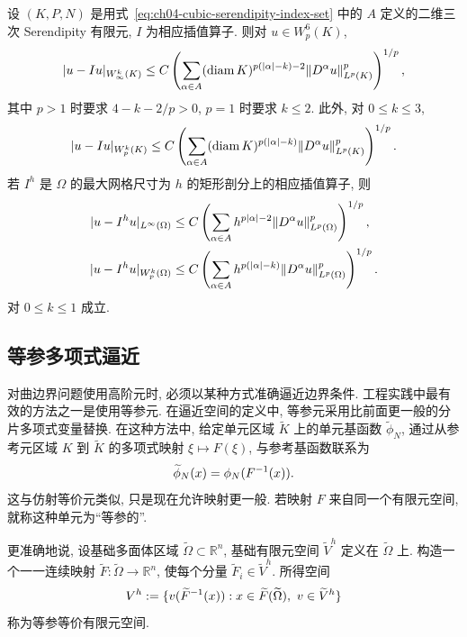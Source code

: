 \setcounter{thmcount}{20}
\begin{Theorem}
\label{thm:ch04-cubic-serendipity}
设 $(K,P,N)$ 是用式~\eqref{eq:ch04-cubic-serendipity-index-set} 中的 $A$ 定义的二维三次 Serendipity 有限元, $I$ 为相应插值算子. 则对 $u\in W_p^6(K)$,
\[
\MathBookFormulaID{formula-ch04-local-cubic-serendipity-linfty}
|u-Iu|_{W_\infty^k(K)}
\leq C\left(\sum_{\alpha\in A}(\operatorname{diam}K)^{p(|\alpha|-k)-2}
\|D^\alpha u\|_{L^p(K)}^p\right)^{1/p},
\]
其中 $p>1$ 时要求 $4-k-2/p>0$, $p=1$ 时要求 $k\leq2$. 此外, 对 $0\leq k\leq3$,
\[
\MathBookFormulaID{formula-ch04-local-cubic-serendipity-lp}
|u-Iu|_{W_p^k(K)}
\leq C\left(\sum_{\alpha\in A}(\operatorname{diam}K)^{p(|\alpha|-k)}
\|D^\alpha u\|_{L^p(K)}^p\right)^{1/p}.
\]
若 $I^h$ 是 $\Omega$ 的最大网格尺寸为 $h$ 的矩形剖分上的相应插值算子, 则
\begin{align*}
\MathBookFormulaID{formula-ch04-global-cubic-serendipity-estimates}
|u-I^h u|_{L^\infty(\Omega)}
&\leq C\left(\sum_{\alpha\in A}h^{p|\alpha|-2}\|D^\alpha u\|_{L^p(\Omega)}^p\right)^{1/p},\\
|u-I^h u|_{W_p^k(\Omega)}
&\leq C\left(\sum_{\alpha\in A}h^{p(|\alpha|-k)}\|D^\alpha u\|_{L^p(\Omega)}^p\right)^{1/p}.
\end{align*}
对 $0\leq k\leq1$ 成立.
\end{Theorem}

\subsection{等参多项式逼近}
\label{sec:ch04-isoparametric-polynomial-approximation}
\setcounter{thmcount}{0}
\setcounter{equation}{0}

对曲边界问题使用高阶元时, 必须以某种方式准确逼近边界条件. 工程实践中最有效的方法之一是使用等参元. 在逼近空间的定义中, 等参元采用比前面更一般的分片多项式变量替换. 在这种方法中, 给定单元区域 $\widetilde K$ 上的单元基函数 $\widetilde\phi_N$, 通过从参考元区域 $K$ 到 $\widetilde K$ 的多项式映射 $\xi\mapsto F(\xi)$, 与参考基函数联系为
\begin{equation}
\MathBookFormulaID{formula-ch04-isoparametric-basis-transformation}
\label{eq:ch04-isoparametric-basis-transformation}
\widetilde\phi_N(x)=\phi_N(F^{-1}(x)).
\end{equation}
这与仿射等价元类似, 只是现在允许映射更一般. 若映射 $F$ 来自同一个有限元空间, 就称这种单元为``等参的''.

更准确地说, 设基础多面体区域 $\widetilde\Omega\subset\mathbb R^n$, 基础有限元空间 $\widetilde V^h$ 定义在 $\widetilde\Omega$ 上. 构造一个一一连续映射 $\widetilde F:\widetilde\Omega\to\mathbb R^n$, 使每个分量 $\widetilde F_i\in\widetilde V^h$. 所得空间
\begin{equation}
\MathBookFormulaID{formula-ch04-isoparametric-equivalent-space}
\label{eq:ch04-isoparametric-equivalent-space}
V^h:=\{v(\widetilde F^{-1}(x)):x\in\widetilde F(\widetilde\Omega),\ v\in\widetilde V^h\}
\end{equation}
称为等参等价有限元空间.

